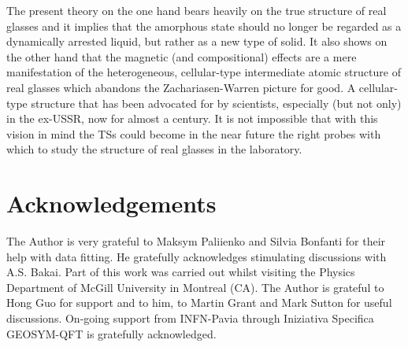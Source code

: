 \documentclass[10pt]{article}
\begin{document}
The present theory on the one hand bears heavily on the true structure of real 
glasses and it implies that the amorphous state should no longer be regarded as a
dynamically arrested liquid, but rather as a new type of solid. It also shows on the
other hand that the magnetic (and compositional) effects are a mere manifestation 
of the heterogeneous, cellular-type intermediate atomic structure of real glasses 
which abandons the Zachariasen-Warren picture for good. A cellular-type structure 
that has been advocated for by scientists, especially (but not only) in the ex-USSR, 
now for almost a century. It is not impossible that with this vision in mind the TSs 
could become in the near future the right probes with which to study the structure 
of real glasses in the laboratory.



\section*{Acknowledgements}
The Author is very grateful to Maksym Paliienko and Silvia Bonfanti for their 
help with data fitting. He gratefully acknowledges stimulating discussions with 
A.S. Bakai. Part of this work was carried out whilst visiting
the Physics Department of McGill University in Montreal (CA). The Author is
grateful to Hong Guo for support and to him, to Martin Grant and Mark Sutton 
for useful discussions. On-going support from INFN-Pavia through Iniziativa
Specifica GEOSYM-QFT is gratefully acknowledged.

 
\end{document}
